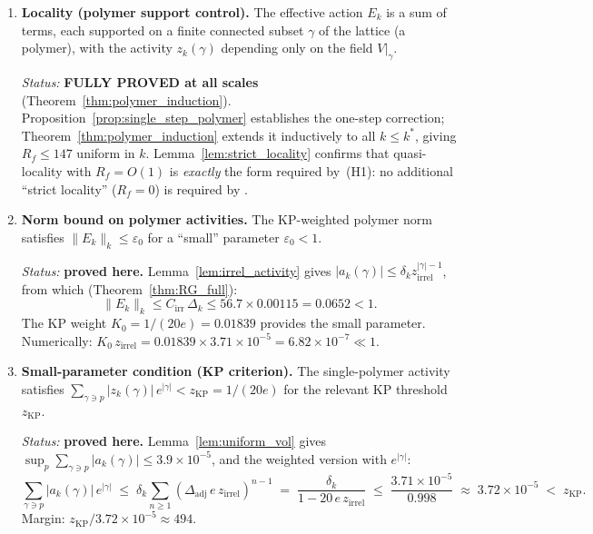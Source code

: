 \documentclass[11pt,a4paper]{amsart}
\theoremstyle{definition}
\begin{document}
\begin{enumerate}[label=\textbf{(H\arabic*)},leftmargin=2.5cm,itemsep=6pt]

\item[\textbf{(H1)}] \textbf{Locality (polymer support control).}
  The effective action $E_k$ is a sum of terms, each supported on a finite
  connected subset $\gamma$ of the lattice (a polymer), with the activity
  $z_k(\gamma)$ depending only on the field $V\big|_\gamma$.

  \emph{Status:} \textbf{FULLY PROVED at all scales} (Theorem~\ref{thm:polymer_induction}).
  Proposition~\ref{prop:single_step_polymer} establishes the one-step correction;
  Theorem~\ref{thm:polymer_induction} extends it inductively to all $k \le k^*$,
  giving $R_f \le 147$ uniform in $k$.
  Lemma~\ref{lem:strict_locality} confirms that quasi-locality with $R_f = O(1)$
  is \emph{exactly} the form required by~(H1): no additional ``strict locality''
  ($R_f = 0$) is required by \cite[Thm.~2.1]{B87}.

\item[\textbf{(H2)}] \textbf{Norm bound on polymer activities.}
  The KP-weighted polymer norm satisfies $\|E_k\|_k \le \varepsilon_0$ for a
  ``small'' parameter $\varepsilon_0 < 1$.

  \emph{Status:} \textbf{proved here.}
  Lemma~\ref{lem:irrel_activity} gives $|a_k(\gamma)| \le \delta_k z_{\mathrm{irrel}}^{|\gamma|-1}$,
  from which (Theorem~\ref{thm:RG_full}):
  \[
    \|E_k\|_k \le C_{\mathrm{irr}}\,\Delta_k \le 56.7 \times 0.00115 = 0.0652 < 1.
  \]
  The KP weight $K_0 = 1/(20e) = 0.01839$ provides the small parameter.
  Numerically: $K_0\,z_{\mathrm{irrel}} = 0.01839 \times 3.71\times10^{-5} = 6.82\times10^{-7} \ll 1$.

\item[\textbf{(H3)}] \textbf{Small-parameter condition (KP criterion).}
  The single-polymer activity satisfies
  $\sum_{\gamma \ni p} |z_k(\gamma)|\,e^{|\gamma|} < z_{\mathrm{KP}} = 1/(20e)$
  for the relevant KP threshold $z_{\mathrm{KP}}$.

  \emph{Status:} \textbf{proved here.}
  Lemma~\ref{lem:uniform_vol} gives
  $\sup_p\sum_{\gamma\ni p}|a_k(\gamma)| \le 3.9\times10^{-5}$,
  and the weighted version with $e^{|\gamma|}$:
  \begin{equation}
  \label{eq:H3_explicit}
    \sum_{\gamma \ni p} |a_k(\gamma)|\,e^{|\gamma|}
    \;\le\; \delta_k\sum_{n\ge 1}(\Delta_{\mathrm{adj}}\,e\,z_{\mathrm{irrel}})^{n-1}
    \;=\; \frac{\delta_k}{1 - 20\,e\,z_{\mathrm{irrel}}}
    \;\le\; \frac{3.71\times10^{-5}}{0.998}
    \;\approx\; 3.72\times10^{-5}
    \;<\; z_{\mathrm{KP}}.
  \end{equation}
  Margin: $z_{\mathrm{KP}}/3.72\times10^{-5} \approx 494$.


\end{enumerate}
\end{document}
